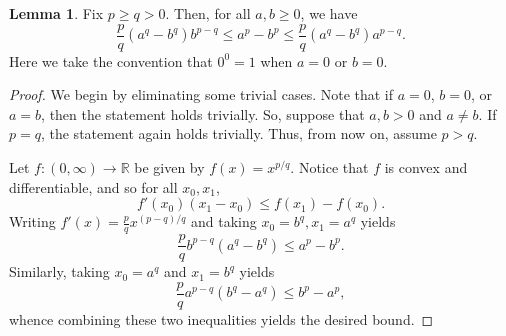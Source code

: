 \documentclass[preprint, reqno]{amsart}
\theoremstyle{definition}
\newtheorem{lemma}[definition]{Lemma}
\numberwithin{equation}{section}
\begin{document}
\begin{lemma}\label{lemma:basicinequality}
  Fix $p \geq q > 0$. Then, for all $a, b \geq 0$, we have
  \[
    \frac{p}{q} (a^q - b^q)b^{p-q}\leq a^p - b^p \leq \frac{p}{q}(a^q
    - b^q) a^{p-q}.
  \]
  Here we take the convention that $0^0=1$ when $a=0$ or $b=0$.
\end{lemma}

\begin{proof}
  We begin by eliminating some trivial cases. Note that if $a=0$,
  $b=0$, or $a=b$, then the statement holds trivially. So, suppose
  that $a, b > 0$ and $a \ne b$. If $p = q$, the statement again holds
  trivially. Thus, from now on, assume $p > q$.

  Let $f : (0, \infty) \to \mathbb{R}$ be given by $f(x) = x^{p/q}$.
  Notice that $f$ is convex and differentiable, and so for all $x_0,
  x_1$,
  \[
    f'(x_0)(x_1 - x_0) \leq f(x_1) - f(x_0).
  \]
  Writing $f'(x) = \frac{p}{q}x^{(p-q)/q}$ and taking $x_0 = b^q, x_1
  = a^q$ yields
  \[
    \frac{p}{q}b^{p-q}(a^q - b^q) \leq a^p - b^p.
  \]
  Similarly, taking $x_0 = a^q$ and $x_1 = b^q$ yields
  \[
    \frac{p}{q}a^{p-q}(b^q-a^q) \leq b^p - a^p,
  \]
  whence combining these two inequalities yields the desired bound.
\end{proof}
\end{document}
